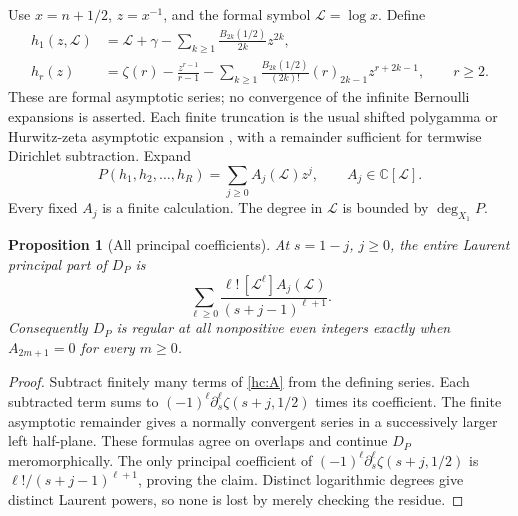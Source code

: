 \documentclass[11pt]{article}
\numberwithin{equation}{section}
\newtheorem{proposition}[theorem]{Proposition}
\theoremstyle{definition}
\theoremstyle{remark}
\begin{document}
Use $x=n+1/2$, $z=x^{-1}$, and the formal symbol $\mathcal L=\log x$. Define
\begin{align}
 h_1(z,\mathcal L)&=\mathcal L+\gamma-
           \sum_{k\ge1}\frac{B_{2k}(1/2)}{2k}z^{2k},\label{hc:h1}\\
 h_r(z)&=\zeta(r)-\frac{z^{r-1}}{r-1}
  -\sum_{k\ge1}\frac{B_{2k}(1/2)}{(2k)!}(r)_{2k-1}
                         z^{r+2k-1},\qquad r\ge2.\label{hc:hr}
\end{align}
These are formal asymptotic series; no convergence of the infinite
Bernoulli expansions is asserted. Each finite truncation is the
usual shifted polygamma or Hurwitz-zeta asymptotic expansion \cite{DLMFGamma,DLMFHurwitz}, with
a remainder sufficient for termwise Dirichlet subtraction.
Expand
\begin{equation}\label{hc:A}
 P(h_1,h_2,\ldots,h_R)=\sum_{j\ge0}A_j(\mathcal L)z^j,
             \qquad A_j\in\mathbb C[\mathcal L].
\end{equation}
Every fixed $A_j$ is a finite calculation. The degree in $\mathcal L$ is
bounded by $\deg_{X_1}P$.

\begin{proposition}[All principal coefficients]
\label{hc:principal}
At $s=1-j$, $j\ge0$, the entire Laurent principal part of $D_P$ is
\begin{equation}\label{hc:principal-formula}
 \sum_{\ell\ge0}
 \frac{\ell!\,[\mathcal L^\ell]A_j(\mathcal L)}{(s+j-1)^{\ell+1}}.
\end{equation}
Consequently $D_P$ is regular at all nonpositive even integers
exactly when $A_{2m+1}=0$ for every $m\ge0$.
\end{proposition}
\begin{proof}
Subtract finitely many terms of \eqref{hc:A} from the defining
series. Each subtracted term sums to
$(-1)^\ell\partial_s^\ell\zeta(s+j,1/2)$ times its coefficient.
The finite asymptotic remainder gives a normally convergent series
in a successively larger left half-plane. These formulas agree on
overlaps and continue $D_P$ meromorphically. The only principal
coefficient of $(-1)^\ell\partial_s^\ell\zeta(s+j,1/2)$ is
$\ell!/(s+j-1)^{\ell+1}$, proving the claim. Distinct logarithmic
degrees give distinct Laurent powers, so none is lost by merely
checking the residue.
\end{proof}
\end{document}
